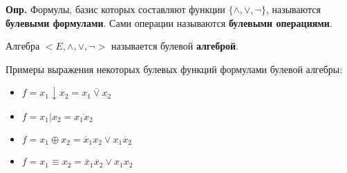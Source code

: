 \documentclass[10pt]{article}
\begin{document}
\par\textbf{Опр.} Формулы, базис которых составляют функции $\{ \land, \lor, \neg \}$, называются \textbf{булевыми формулами}. Сами операции называются \textbf{булевыми операциями}.

\par Алгебра $<E, \land, \lor, \neg>$ называется булевой \textbf{алгеброй}.

\par Примеры выражения некоторых булевых функций формулами булевой алгебры:
\begin{itemize}
    \item $f = x_1 \downarrow x_2 = \overline {x_1 \lor x_2}$
    \item $f = x_1 \vert x_2 = \overline{x_1 x_2}$
    \item $f = x_1 \oplus x_2 = \overline x_1 x_2 \lor x_1 \overline x_2$
    \item $f = x_1 \equiv x_2 = \overline x_1 \overline x_2 \lor x_1 x_2$
\end{itemize}
\end{document}
